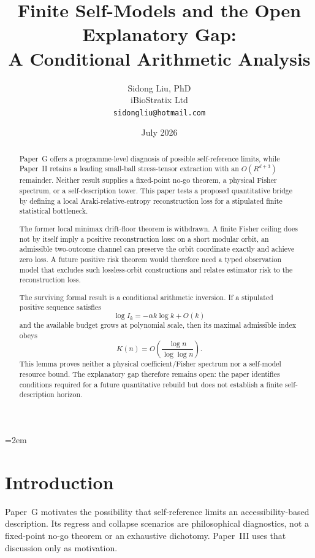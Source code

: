 \documentclass[12pt]{article}
\title{%
  \textbf{Finite Self-Models and the Open Explanatory Gap:}\\
  \textbf{A Conditional Arithmetic Analysis}%
}
\author{
  Sidong Liu, PhD \\
  \small iBioStratix Ltd \\
  \small \texttt{sidongliu@hotmail.com}
}
\date{July 2026}
\theoremstyle{definition}
\theoremstyle{remark}
\begin{document}
\emergencystretch=2em
\raggedbottom
{}

\maketitle

\begin{abstract}
Paper~G offers a programme-level diagnosis of possible self-reference
limits, while Paper~II retains a leading small-ball stress-tensor
extraction with an \(O(R^{d+3})\) remainder. Neither result supplies a
fixed-point no-go theorem, a physical Fisher spectrum, or a
self-description tower. This paper tests a proposed quantitative bridge
by defining a local Araki-relative-entropy reconstruction loss for a
stipulated finite statistical bottleneck.

The former local minimax drift-floor theorem is withdrawn. A finite
Fisher ceiling does not by itself imply a positive reconstruction loss:
on a short modular orbit, an admissible two-outcome channel can preserve
the orbit coordinate exactly and achieve zero loss. A future positive
risk theorem would therefore need a typed observation model that excludes
such lossless-orbit constructions and relates estimator risk to the
reconstruction loss.

The surviving formal result is a conditional arithmetic inversion. If a
stipulated positive sequence satisfies
\[
\log I_k=-\alpha k\log k+O(k)
\]
and the available budget grows at polynomial scale, then its maximal
admissible index obeys
\[
K(n)=O\!\left(\frac{\log n}{\log\log n}\right).
\]
This lemma proves neither a physical coefficient/Fisher spectrum nor a
self-model resource bound. The explanatory gap therefore remains open:
the paper identifies conditions required for a future quantitative
rebuild but does not establish a finite self-description horizon.
 \end{abstract}

\clearpage
\tableofcontents
\clearpage

\section{Introduction}\label{sec:1}

Paper~G\cite{PaperG} motivates the possibility that self-reference
limits an accessibility-based description. Its regress and collapse
scenarios are philosophical diagnostics, not a fixed-point no-go theorem
or an exhaustive dichotomy. Paper~III uses that discussion only as
motivation.
\end{document}
